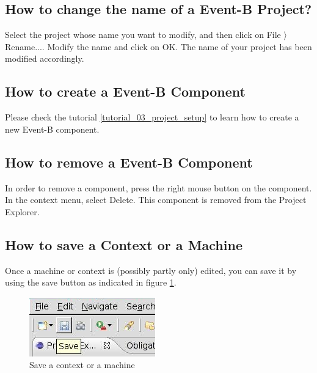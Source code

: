 \subsection{How to change the name of a Event-B Project?}


Select the project whose name you want to modify, and then click on \textsf{File $\rangle$ Rename...}. Modify the name and click on \textsf{OK}. The name of your project has been modified accordingly. 

\subsection{How to create a Event-B Component}

Please check the tutorial \ref{tutorial_03_project_setup} to learn how to create a new Event-B component.

\subsection{How to remove a Event-B Component}

In order to remove a component, press the right mouse button on the component. In the context menu, select \textsf{Delete}. This component is removed from the \textsf{Project Explorer}. 

\subsection{How to save a Context or a Machine}


Once a machine or context is (possibly partly only) edited, you can save it by using the save button as indicated in figure \ref{fig_faq_saveaction}.

\begin{figure}[!h]
\begin{center}
	\includegraphics{img/faq/faq_saveaction.png}
	\caption{Save a context or a machine}
	\label{fig_faq_saveaction}
\end{center}
\end{figure}


